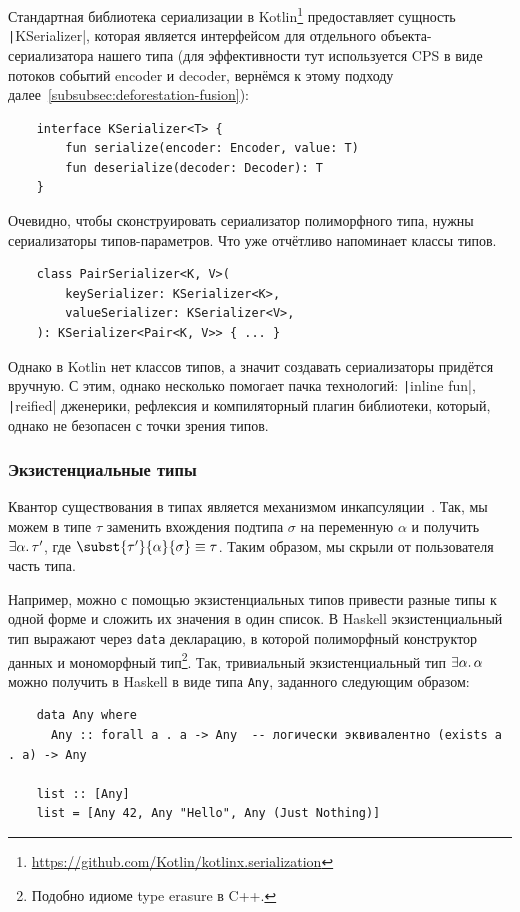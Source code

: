 Стандартная библиотека сериализации в Kotlin\footnote{\url{https://github.com/Kotlin/kotlinx.serialization}} предоставляет сущность \texttt|KSerializer|, которая является интерфейсом для отдельного объекта-сериализатора нашего типа (для эффективности тут используется CPS в виде потоков событий encoder и decoder, вернёмся к этому подходу далее\ \ref{subsubsec:deforestation-fusion}):
\begin{verbatim}
    interface KSerializer<T> {
        fun serialize(encoder: Encoder, value: T)
        fun deserialize(decoder: Decoder): T
    }
\end{verbatim}

Очевидно, чтобы сконструировать сериализатор полиморфного типа, нужны сериализаторы типов-параметров.
Что уже отчётливо напоминает классы типов.
\begin{verbatim}
    class PairSerializer<K, V>(
        keySerializer: KSerializer<K>,
        valueSerializer: KSerializer<V>,
    ): KSerializer<Pair<K, V>> { ... }
\end{verbatim}

Однако в Kotlin нет классов типов, а значит создавать сериализаторы придётся вручную.
С этим, однако несколько помогает пачка технологий: \texttt|inline fun|, \texttt|reified| дженерики, рефлексия и компиляторный плагин библиотеки, который, однако не безопасен с точки зрения типов.

\subsubsection{Экзистенциальные типы} \label{subsubsec:existentials}

Квантор существования в типах является механизмом инкапсуляции~\cite[глава 24]{pierce2002types}.
Так, мы можем в типе $\tau$ заменить вхождения подтипа $\sigma$ на переменную $\alpha$ и получить $\exists \alpha\ldotp \tau'$, где $\subst{\tau'}{\alpha}{\sigma}\equiv\tau$.
Таким образом, мы скрыли от пользователя часть типа.

Например, можно с помощью экзистенциальных типов привести разные типы к одной форме и сложить их значения в один список.
В Haskell экзистенциальный тип выражают через \texttt{data} декларацию, в которой полиморфный конструктор данных и мономорфный тип\footnote{Подобно идиоме type erasure в C++.}.
Так, тривиальный экзистенциальный тип $\exists \alpha\ldotp \alpha$ можно получить в Haskell в виде типа \texttt{Any}, заданного следующим образом:
\begin{verbatim}
    data Any where
      Any :: forall a . a -> Any  -- логически эквивалентно (exists a . a) -> Any

    list :: [Any]
    list = [Any 42, Any "Hello", Any (Just Nothing)]
\end{verbatim}

